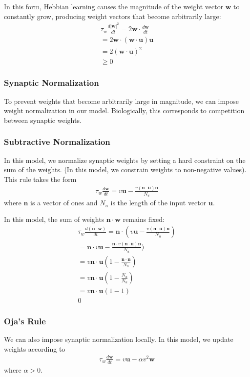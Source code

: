 \documentclass[pageno]{mat323paper}
\begin{document}
In this form, Hebbian learning causes the magnitude of the weight vector $\mathbf{w}$ to constantly grow, producing weight vectors that become arbitrarily large:
\begin{align*}
\tau_w\frac{d|\mathbf{w}|^2}{dt}=2\mathbf{w}\cdot\frac{d\mathbf{w}}{dt}\\
=2\mathbf{w}\cdot(\mathbf{w}\cdot\mathbf{u})\mathbf{u}\\
=2(\mathbf{w}\cdot\mathbf{u})^2\\
\geq0
\end{align*}

\subsubsection{Synaptic Normalization}
To prevent weights that become arbitrarily large in magnitude, we can impose weight normalization in our model. Biologically, this corresponds to competition between synaptic weights.

\subsubsection*{Subtractive Normalization}
In this model, we normalize synaptic weights by setting a hard constraint on the sum of the weights. (In this model, we constrain weights to non-negative values). This rule takes the form
\begin{align}
\tau_w\frac{d\mathbf{w}}{dt}=v\mathbf{u}-\frac{v(\mathbf{n}\cdot\mathbf{u})\mathbf{n}}{N_u}
\end{align}
where $\mathbf{n}$ is a vector of ones and $N_u$ is the length of the input vector $\mathbf{u}$.

In this model, the sum of weights $\mathbf{n}\cdot\mathbf{w}$ remains fixed:
\begin{align*}
\tau_w\frac{d(\mathbf{n}\cdot\mathbf{w})}{dt}=\mathbf{n}\cdot(v\mathbf{u}-\frac{v(\mathbf{n}\cdot\mathbf{u})\mathbf{n}}{N_u})\\
=\mathbf{n}\cdot v\mathbf{u}-\frac{\mathbf{n}\cdot v(\mathbf{n}\cdot\mathbf{u})\mathbf{n}}{N_u})\\
=v\mathbf{n}\cdot\mathbf{u}(1-\frac{\mathbf{n}\cdot\mathbf{n}}{N_u})\\
=v\mathbf{n}\cdot\mathbf{u}(1-\frac{N_u}{N_u})\\
=v\mathbf{n}\cdot\mathbf{u}(1-1)\\
0
\end{align*}

\subsubsection*{Oja's Rule}
We can also impose synaptic normalization locally. In this model, we update weights according to
\begin{align}
\tau_w\frac{d\mathbf{w}}{dt}=v\mathbf{u}-\alpha v^2\mathbf{w}
\end{align}
where $\alpha>0$.
\end{document}
